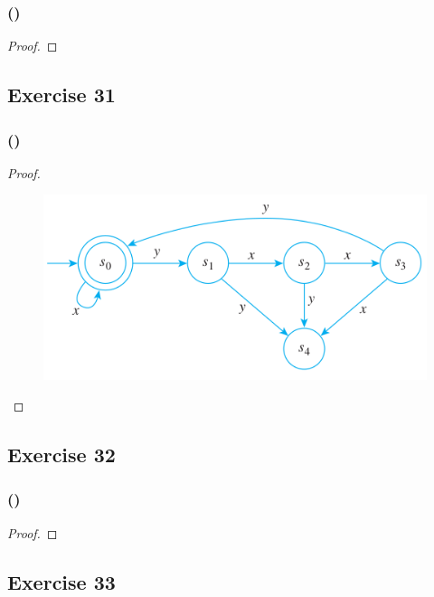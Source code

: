 \documentclass[14pt]{extarticle}
\begin{document}
\subsubsection{()}

\begin{proof}

\end{proof}

\subsection{Exercise 31}

\subsubsection{()}

\begin{proof}
\begin{figure}[ht!]
\centering
\includegraphics[scale=0.5]{../images/12.2.31.png}
\end{figure}
\end{proof}

\subsection{Exercise 32}

\subsubsection{()}

\begin{proof}

\end{proof}

\subsection{Exercise 33}
\end{document}
